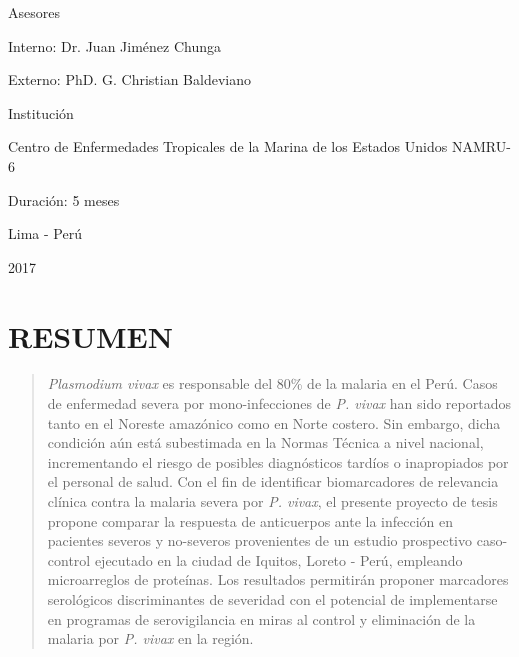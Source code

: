 \documentclass[a4paper]{article}
\begin{document}
\begin{centering}
\vspace{.3 cm}

Asesores

Interno: Dr. Juan Jiménez Chunga %

Externo: PhD. G. Christian Baldeviano

\vspace{.3 cm}

Institución

Centro de Enfermedades Tropicales de la Marina de los Estados Unidos 
NAMRU-6

\vspace{.3 cm}

Duración: 5 meses

\vspace{1.5 cm}

\Large
Lima - Perú


2017

\end{centering}

\vfill
\restoregeometry
\clearpage

\newpage

\tableofcontents

\newpage


\section*{RESUMEN}\label{resumen}

\begin{quote}
\emph{Plasmodium vivax} es responsable del 80\% de la malaria en el
Perú. Casos de enfermedad severa por mono-infecciones de \emph{P. vivax}
han sido reportados tanto en el Noreste amazónico como en Norte costero.
Sin embargo, dicha condición aún está subestimada en la Normas Técnica a
nivel nacional, incrementando el riesgo de posibles diagnósticos tardíos
o inapropiados por el personal de salud. Con el fin de identificar
biomarcadores de relevancia clínica contra la malaria severa por
\emph{P. vivax}, el presente proyecto de tesis propone comparar la
respuesta de anticuerpos ante la infección en pacientes severos y
no-severos provenientes de un estudio prospectivo caso-control ejecutado
en la ciudad de Iquitos, Loreto - Perú, empleando microarreglos de
proteínas. Los resultados permitirán proponer marcadores serológicos
discriminantes de severidad con el potencial de implementarse en
programas de serovigilancia en miras al control y eliminación de la
malaria por \emph{P. vivax} en la región.
\end{quote}
\end{document}
